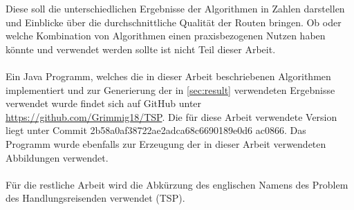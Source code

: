 Diese soll die unterschiedlichen Ergebnisse der Algorithmen in Zahlen darstellen und Einblicke über die durchschnittliche Qualität der Routen bringen.
Ob oder welche Kombination von Algorithmen einen praxisbezogenen Nutzen haben könnte und verwendet werden sollte ist nicht Teil dieser Arbeit.
\\\\
Ein Java Programm, welches die in dieser Arbeit beschriebenen Algorithmen implementiert und zur Generierung der in  \vref{sec:result} verwendeten Ergebnisse verwendet wurde findet sich auf GitHub unter \href{https://github.com/Grimmig18/TSP}{https://github.com/Grimmig18/TSP}. 
Die für diese Arbeit verwendete Version liegt unter Commit 2b58a0af38722ae2adca68c6690189e0d6 ac0866.
Das Programm wurde ebenfalls zur Erzeugung der in dieser Arbeit verwendeten Abbildungen verwendet.
\\\\
Für die restliche Arbeit wird die Abkürzung des englischen Namens des Problem des Handlungsreisenden verwendet (\ac{TSP}).
